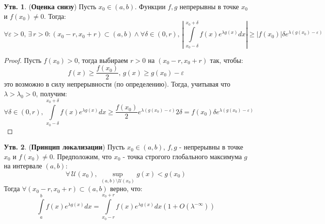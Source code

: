 \documentclass[12pt]{article}
\newcommand{\MU}{\mathcal{U}}
\newcommand{\VE}{\varepsilon}
\theoremstyle{definition}
\newtheorem{prop}{Утв.}
\newcommand{\ddint}[2]{\displaystyle\int\limits_{#1}^{#2}}
\begin{document}
\begin{prop}(\textbf{Оценка снизу})
	Пусть $x_0 \in (a,b)$. Функции $f,g$ непрерывны в точке $x_0$ и $f(x_0) \neq 0$. Тогда:
	$$
		\forall \VE > 0, \, \exists \, r > 0 \colon (x_0 -r, x_0 + r) \subset (a,b) \wedge \forall \delta \in (0, r), \, \left|\, \ddint{x_0 - \delta}{x_0 + \delta}f(x)e^{\lambda g(x)}dx \right| \geq |f(x_0)|\delta e^{\lambda(g(x_0) - \VE)}
	$$
\end{prop}
\begin{proof}
	Пусть $f(x_0) > 0$, тогда выбираем $r > 0$ на $(x_0 - r, x_0 + r)$ так, чтобы:
	$$
		f(x) \geq \dfrac{f(x_0)}{2}, \, g(x) \geq g(x_0) - \VE
	$$
	это возможно в силу непрерывности (по определению). Тогда, учитывая что $\lambda > \lambda_0 > 0$, получим:
	$$
		\forall \delta \in (0,r), \, \ddint{x_0 - \delta}{x_0 + \delta}f(x)e^{\lambda g(x)}dx \geq \dfrac{f(x_0)}{2}e^{\lambda(g(x_0) - \VE)}2\delta = f(x_0)\delta e^{\lambda(g(x_0) - \VE)} 
	$$
\end{proof}
\newpage
\begin{prop}(\textbf{Принцип локализации})
	Пусть $x_0 \in (a,b)$, $f,g$ - непрерывны в точке $x_0$ и $f(x_0) \neq 0$. Предположим, что $x_0$ - точка строгого глобального максимума $g$ на интервале $(a,b)$:
	$$
		\forall \, \MU(x_0), \, \sup\limits_{(a,b) \setminus \MU(x_0)} g(x) < g(x_0)
	$$
	Тогда $\forall (x_0 - r, x_0 + r) \subset (a,b)$ верно, что:
	$$
		\ddint{a}{b}f(x)e^{\lambda g(x)}dx = \ddint{x_0 - r}{x_0 + r}f(x)e^{\lambda g(x)}dx \left(1 + O(\lambda^{-\infty})\right)
	$$
\end{prop}
\end{document}
